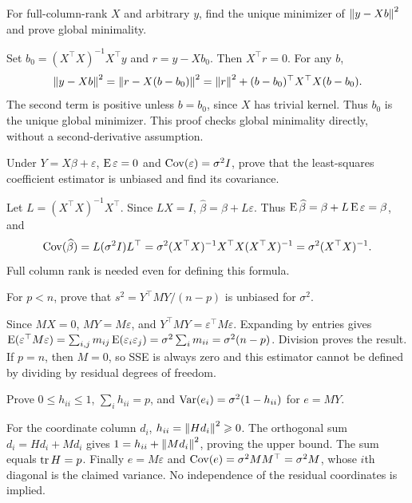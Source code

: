 \begin{problem}
For full-column-rank $X$ and arbitrary $y$, find the unique minimizer of
$\left\lVert y-Xb\right\rVert^2$ and prove global minimality.
\end{problem}
\begin{solution}
Set $b_0=(X^\top X)^{-1}X^\top y$ and $r=y-Xb_0$.
Then $X^\top r=0$. For any $b$,
\[
\left\lVert y-Xb\right\rVert^2=\left\lVert r-X(b-b_0)\right\rVert^2
=\left\lVert r\right\rVert^2+(b-b_0)^\top X^\top X(b-b_0).
\]
The second term is positive unless $b=b_0$, since $X$ has trivial kernel.
Thus $b_0$ is the unique global minimizer. This proof checks global
minimality directly, without a second-derivative assumption.
\end{solution}

\begin{problem}
Under $Y=X\beta+\varepsilon$, $\operatorname{E}\varepsilon=0$ and
$\operatorname{Cov}(\varepsilon)=\sigma^2I$, prove that the least-squares coefficient
estimator is unbiased and find its covariance.
\end{problem}
\begin{solution}
Let $L=(X^\top X)^{-1}X^\top$. Since $LX=I$,
$\widehat\beta=\beta+L\varepsilon$. Thus
$\operatorname{E}\widehat\beta=\beta+L\operatorname{E}\varepsilon=\beta$, and
\[
\operatorname{Cov}(\widehat\beta)=L(\sigma^2I)L^\top
=\sigma^2(X^\top X)^{-1}X^\top X(X^\top X)^{-1}
=\sigma^2(X^\top X)^{-1}.
\]
Full column rank is needed even for defining this formula.
\end{solution}

\begin{problem}
For $p<n$, prove that $s^2=Y^\top MY/(n-p)$ is unbiased for $\sigma^2$.
\end{problem}
\begin{solution}
Since $MX=0$, $MY=M\varepsilon$, and
$Y^\top MY=\varepsilon^\top M\varepsilon$.
Expanding by entries gives
$\operatorname{E}(\varepsilon^\top M\varepsilon)=\sum_{i,j}m_{ij}\operatorname{E}(\varepsilon_i\varepsilon_j)
=\sigma^2\sum_i m_{ii}=\sigma^2(n-p)$.
Division proves the result. If $p=n$, then $M=0$, so SSE is always zero
and this estimator cannot be defined by dividing by residual degrees
of freedom.
\end{solution}

\begin{problem}
Prove $0\leqslant h_{ii}\leqslant1$, $\sum_i h_{ii}=p$, and
$\operatorname{Var}(e_i)=\sigma^2(1-h_{ii})$ for $e=MY$.
\end{problem}
\begin{solution}
For the coordinate column $d_i$, $h_{ii}=\left\lVert Hd_i\right\rVert^2\geqslant0$.
The orthogonal sum $d_i=Hd_i+Md_i$ gives
$1=h_{ii}+\left\lVert Md_i\right\rVert^2$, proving the upper bound.
The sum equals $\operatorname{tr} H=p$. Finally $e=M\varepsilon$ and
$\operatorname{Cov}(e)=\sigma^2MM^\top=\sigma^2M$, whose $i$th diagonal is the claimed
variance. No independence of the residual coordinates is implied.
\end{solution}

